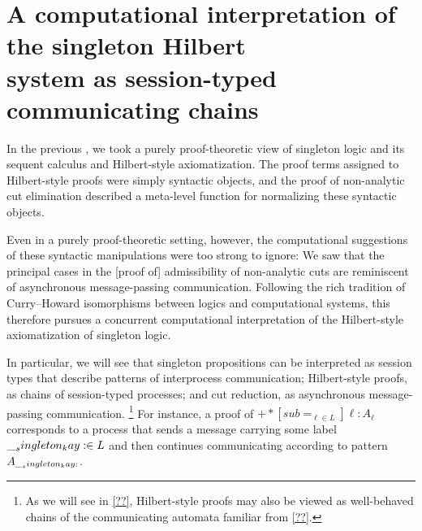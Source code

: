 \chapter{A computational interpretation of the singleton Hilbert\\system as session-typed communicating chains}\label{ch:process-chains}

In the previous , we took a purely proof-theoretic view of singleton logic and its sequent calculus and Hilbert-style axiomatization.
The proof terms assigned to Hilbert-style proofs were simply syntactic objects,
and the proof of non-analytic cut elimination described a meta-level function for normalizing these syntactic objects.

Even in a purely proof-theoretic setting, however, the computational suggestions of these syntactic manipulations were too strong to ignore:
We saw that the principal cases in the [proof of] admissibility of non-analytic cuts
are reminiscent of asynchronous message-passing communication.
Following the rich tradition of Curry--Howard isomorphisms between logics and computational systems, this  therefore pursues a concurrent computational interpretation of the Hilbert-style axiomatization of singleton logic.

In particular, we will see that singleton propositions can be interpreted as session types that describe patterns of interprocess communication; Hilbert-style proofs, as chains of session-typed processes; and cut reduction, as asynchronous message-passing communication.%
\footnote{As we will see in \cref{??}, Hilbert-style proofs may also be viewed as well-behaved chains of the communicating automata familiar from \cref{??}.}
For instance, a proof of $\plus*[sub=_{\ell \in L}]{\ell:A_{\ell}}$ corresponds to a process that sends a message carrying some label $\__singleton_kay: \in L$ and then continues communicating according to pattern $A_{\__singleton_kay:}$.

